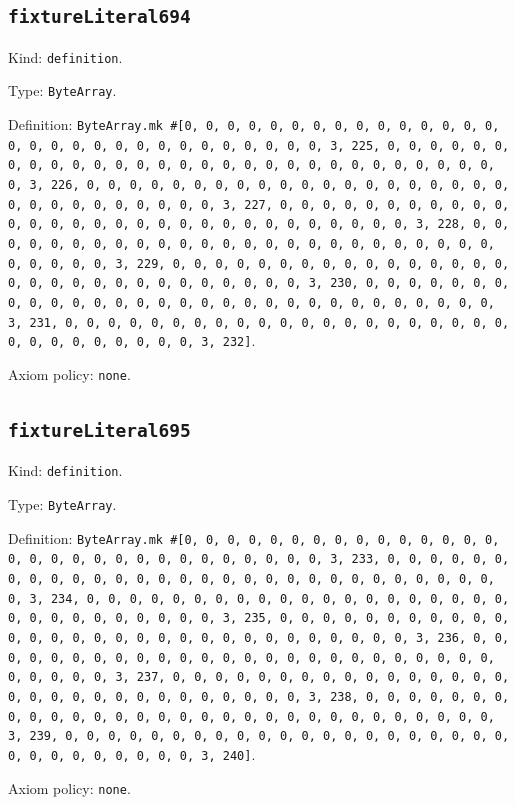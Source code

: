 \documentclass[11pt]{article}
\begin{document}
\subsection*{\texttt{fixtureLiteral694}}
\noindent Kind: \texttt{definition}.\par
\noindent Type: \texttt{ByteArray}.\par
\noindent Definition: \texttt{ByteArray.mk \#[0, 0, 0, 0, 0, 0, 0, 0, 0, 0, 0, 0, 0, 0, 0, 0, 0, 0, 0, 0, 0, 0, 0, 0, 0, 0, 0, 0, 0, 0, 3, 225, 0, 0, 0, 0, 0, 0, 0, 0, 0, 0, 0, 0, 0, 0, 0, 0, 0, 0, 0, 0, 0, 0, 0, 0, 0, 0, 0, 0, 0, 0, 3, 226, 0, 0, 0, 0, 0, 0, 0, 0, 0, 0, 0, 0, 0, 0, 0, 0, 0, 0, 0, 0, 0, 0, 0, 0, 0, 0, 0, 0, 0, 0, 3, 227, 0, 0, 0, 0, 0, 0, 0, 0, 0, 0, 0, 0, 0, 0, 0, 0, 0, 0, 0, 0, 0, 0, 0, 0, 0, 0, 0, 0, 0, 0, 3, 228, 0, 0, 0, 0, 0, 0, 0, 0, 0, 0, 0, 0, 0, 0, 0, 0, 0, 0, 0, 0, 0, 0, 0, 0, 0, 0, 0, 0, 0, 0, 3, 229, 0, 0, 0, 0, 0, 0, 0, 0, 0, 0, 0, 0, 0, 0, 0, 0, 0, 0, 0, 0, 0, 0, 0, 0, 0, 0, 0, 0, 0, 0, 3, 230, 0, 0, 0, 0, 0, 0, 0, 0, 0, 0, 0, 0, 0, 0, 0, 0, 0, 0, 0, 0, 0, 0, 0, 0, 0, 0, 0, 0, 0, 0, 3, 231, 0, 0, 0, 0, 0, 0, 0, 0, 0, 0, 0, 0, 0, 0, 0, 0, 0, 0, 0, 0, 0, 0, 0, 0, 0, 0, 0, 0, 0, 0, 3, 232]}.\par
\noindent Axiom policy: \texttt{none}.\par
\subsection*{\texttt{fixtureLiteral695}}
\noindent Kind: \texttt{definition}.\par
\noindent Type: \texttt{ByteArray}.\par
\noindent Definition: \texttt{ByteArray.mk \#[0, 0, 0, 0, 0, 0, 0, 0, 0, 0, 0, 0, 0, 0, 0, 0, 0, 0, 0, 0, 0, 0, 0, 0, 0, 0, 0, 0, 0, 0, 3, 233, 0, 0, 0, 0, 0, 0, 0, 0, 0, 0, 0, 0, 0, 0, 0, 0, 0, 0, 0, 0, 0, 0, 0, 0, 0, 0, 0, 0, 0, 0, 3, 234, 0, 0, 0, 0, 0, 0, 0, 0, 0, 0, 0, 0, 0, 0, 0, 0, 0, 0, 0, 0, 0, 0, 0, 0, 0, 0, 0, 0, 0, 0, 3, 235, 0, 0, 0, 0, 0, 0, 0, 0, 0, 0, 0, 0, 0, 0, 0, 0, 0, 0, 0, 0, 0, 0, 0, 0, 0, 0, 0, 0, 0, 0, 3, 236, 0, 0, 0, 0, 0, 0, 0, 0, 0, 0, 0, 0, 0, 0, 0, 0, 0, 0, 0, 0, 0, 0, 0, 0, 0, 0, 0, 0, 0, 0, 3, 237, 0, 0, 0, 0, 0, 0, 0, 0, 0, 0, 0, 0, 0, 0, 0, 0, 0, 0, 0, 0, 0, 0, 0, 0, 0, 0, 0, 0, 0, 0, 3, 238, 0, 0, 0, 0, 0, 0, 0, 0, 0, 0, 0, 0, 0, 0, 0, 0, 0, 0, 0, 0, 0, 0, 0, 0, 0, 0, 0, 0, 0, 0, 3, 239, 0, 0, 0, 0, 0, 0, 0, 0, 0, 0, 0, 0, 0, 0, 0, 0, 0, 0, 0, 0, 0, 0, 0, 0, 0, 0, 0, 0, 0, 0, 3, 240]}.\par
\noindent Axiom policy: \texttt{none}.\par
\end{document}
